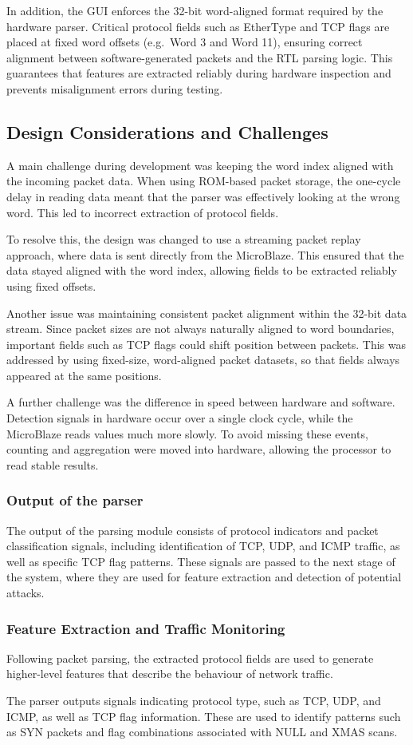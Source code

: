 In addition, the GUI enforces the 32-bit word-aligned format required by
the hardware parser. Critical protocol fields such as EtherType and TCP
flags are placed at fixed word offsets (e.g.\ Word 3 and Word 11), ensuring
correct alignment between software-generated packets and the RTL parsing
logic. This guarantees that features are extracted reliably during
hardware inspection and prevents misalignment errors during testing.


\subsection{Design Considerations and Challenges}
A main challenge during development was keeping the word index aligned with the
incoming packet data. When using ROM-based packet storage, the one-cycle delay
in reading data meant that the parser was effectively looking at the wrong word.
This led to incorrect extraction of protocol fields.

To resolve this, the design was changed to use a streaming packet replay
approach, where data is sent directly from the MicroBlaze. This ensured that
the data stayed aligned with the word index, allowing fields to be extracted
reliably using fixed offsets.

Another issue was maintaining consistent packet alignment within the 32-bit
data stream. Since packet sizes are not always naturally aligned to word
boundaries, important fields such as TCP flags could shift position between
packets. This was addressed by using fixed-size, word-aligned packet datasets,
so that fields always appeared at the same positions.

A further challenge was the difference in speed between hardware and software.
Detection signals in hardware occur over a single clock cycle, while the
MicroBlaze reads values much more slowly. To avoid missing these events,
counting and aggregation were moved into hardware, allowing the processor to
read stable results.

\subsubsection{Output of the parser}
The output of the parsing module consists of protocol indicators and packet
classification signals, including identification of TCP, UDP, and ICMP traffic,
as well as specific TCP flag patterns. These signals are passed to the next
stage of the system, where they are used for feature extraction and detection
of potential attacks.

\subsubsection{Feature Extraction and Traffic Monitoring}
Following packet parsing, the extracted protocol fields are used to generate
higher-level features that describe the behaviour of network traffic.

The parser outputs signals indicating protocol type, such as TCP, UDP, and
ICMP, as well as TCP flag information. These are used to identify patterns such
as SYN packets and flag combinations associated with NULL and XMAS scans.
